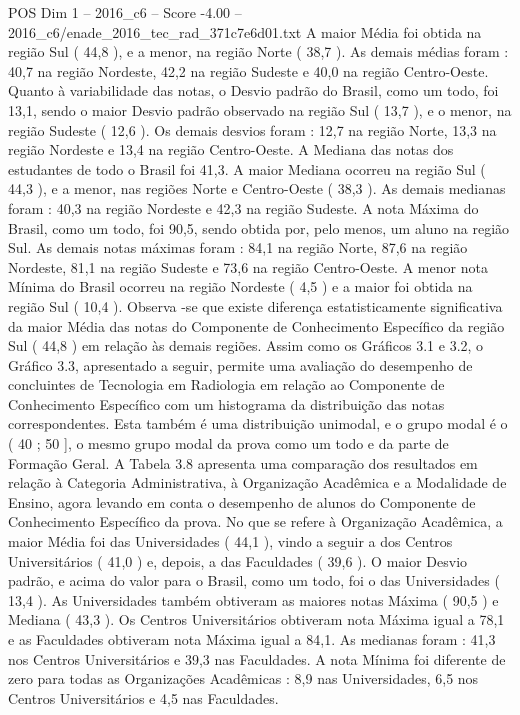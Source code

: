 \begin{textsample}{POS Dim 1 – 2016\_c6 – Score -4.00 – 2016\_c6/enade\_2016\_tec\_rad\_371c7e6d01.txt}
A maior Média foi obtida na região Sul ( 44,8 ), e a menor, na região Norte ( 38,7 ).
As demais médias foram : 40,7 na região Nordeste, 42,2 na região Sudeste e 40,0 na região Centro-Oeste.
Quanto à variabilidade das notas, o Desvio padrão do Brasil, como um todo, foi 13,1, sendo o maior Desvio padrão observado na região Sul ( 13,7 ), e o menor, na região Sudeste ( 12,6 ).
Os demais desvios foram : 12,7 na região Norte, 13,3 na região Nordeste e 13,4 na região Centro-Oeste.
A Mediana das notas dos estudantes de todo o Brasil foi 41,3.
A maior Mediana ocorreu na região Sul ( 44,3 ), e a menor, nas regiões Norte e Centro-Oeste ( 38,3 ).
As demais medianas foram : 40,3 na região Nordeste e 42,3 na região Sudeste.
A nota Máxima do Brasil, como um todo, foi 90,5, sendo obtida por, pelo menos, um aluno na região Sul.
As demais notas máximas foram : 84,1 na região Norte, 87,6 na região Nordeste, 81,1 na região Sudeste e 73,6 na região Centro-Oeste.
A menor nota Mínima do Brasil ocorreu na região Nordeste ( 4,5 ) e a maior foi obtida na região Sul ( 10,4 ).
Observa -se que existe diferença estatisticamente significativa da maior Média das notas do Componente de Conhecimento Específico da região Sul ( 44,8 ) em relação às demais regiões.
Assim como os Gráficos 3.1 e 3.2, o Gráfico 3.3, apresentado a seguir, permite uma avaliação do desempenho de concluintes de Tecnologia em Radiologia em relação ao Componente de Conhecimento Específico com um histograma da distribuição das notas correspondentes.
Esta também é uma distribuição unimodal, e o grupo modal é o ( 40 ; 50 ], o mesmo grupo modal da prova como um todo e da parte de Formação Geral.
A Tabela 3.8 apresenta uma comparação dos resultados em relação à Categoria Administrativa, à Organização Acadêmica e a Modalidade de Ensino, agora levando em conta o desempenho de alunos do Componente de Conhecimento Específico da prova.
No que se refere à Organização Acadêmica, a maior Média foi das Universidades ( 44,1 ), vindo a seguir a dos Centros Universitários ( 41,0 ) e, depois, a das Faculdades ( 39,6 ).
O maior Desvio padrão, e acima do valor para o Brasil, como um todo, foi o das Universidades ( 13,4 ).
As Universidades também obtiveram as maiores notas Máxima ( 90,5 ) e Mediana ( 43,3 ).
Os Centros Universitários obtiveram nota Máxima igual a 78,1 e as Faculdades obtiveram nota Máxima igual a 84,1.
As medianas foram : 41,3 nos Centros Universitários e 39,3 nas Faculdades.
A nota Mínima foi diferente de zero para todas as Organizações Acadêmicas : 8,9 nas Universidades, 6,5 nos Centros Universitários e 4,5 nas Faculdades.

\end{textsample}
